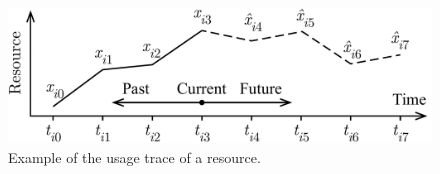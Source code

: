 \begin{figure}[b]
  \centering
  \vspace{-1.5em}
  \includegraphics[width=1.0\columnwidth]{include/assets/figures/example.pdf}
  \vspace{-1.5em}
  \caption{
    Example of the usage trace of a resource.
  }
\end{figure}
